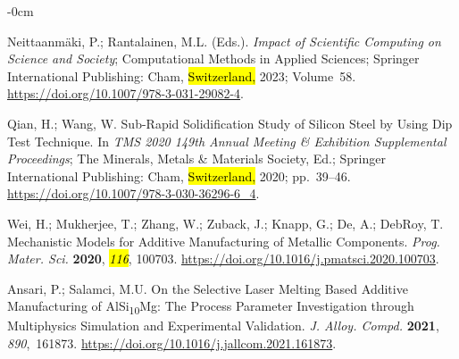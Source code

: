 \documentclass[metals,article,accept,pdftex,moreauthors]{Definitions/mdpi}
\begin{document}




\begin{adjustwidth}{-\extralength}{0cm}	

%

\begin{thebibliography}{999}

Neittaanm{\"a}ki, P.; Rantalainen, M.L. (Eds.).
{\em Impact of Scientific Computing on Science and Society}; Computational Methods in Applied Sciences; Springer International Publishing: Cham, \hl{Switzerland,} %
2023; Volume~58.
{\url{https://doi.org/10.1007/978-3-031-29082-4}}.

Qian, H.; Wang, W.
Sub-Rapid Solidification Study of Silicon Steel by Using Dip Test Technique. 
In \emph{TMS 2020 149th Annual Meeting \& Exhibition Supplemental Proceedings}; The Minerals, Metals \& Materials Society, Ed.; Springer International Publishing: Cham, \hl{Switzerland,} 2020; \mbox{pp. 39--46}.
{\url{https://doi.org/10.1007/978-3-030-36296-6_4}}.

Wei, H.; Mukherjee, T.; Zhang, W.; Zuback, J.; Knapp, G.; De, A.; DebRoy, T.
Mechanistic Models for Additive Manufacturing of Metallic Components.
{\em Prog. Mater. Sci.} {\bf 2020}, \emph{\hl{116}}, 100703.
{\url{https://doi.org/10.1016/j.pmatsci.2020.100703}}.

Ansari, P.; Salamci, M.U.
On the Selective Laser Melting Based Additive Manufacturing of  AlSi\textsubscript{10}Mg: The Process Parameter Investigation through Multiphysics Simulation and Experimental Validation.
{\em J. Alloy. Compd.} {\bf 2021}, {\em 890},~161873.
{\url{https://doi.org/10.1016/j.jallcom.2021.161873}}.


\end{thebibliography}
\end{adjustwidth}
\end{document}
